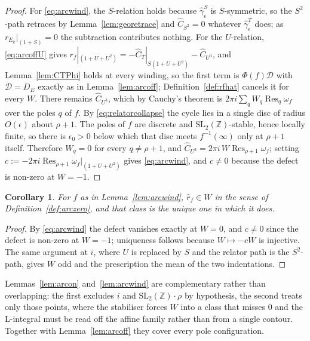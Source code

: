 \documentclass[11pt]{article}
\newtheorem{corollary}[theorem]{Corollary}
\newcommand{\ZZ}{\mathbb{Z}}
\newcommand{\SLZ}{\mathrm{SL}_2(\ZZ)}
\DeclareMathOperator{\Res}{Res}
\begin{document}
\begin{proof}
For \eqref{eq:arcwind}, the $S$-relation holds because $\hat\gamma^S_\epsilon$ is $S$-symmetric,
so the $S^2$-path retraces by Lemma~\ref{lem:georetrace} and $\hat C_{S^2}=0$ whatever
$\hat\gamma^T_\epsilon$ does; as $r_{E_k}|_{(1+S)}=0$ the subtraction contributes nothing. For the
$U$-relation, \eqref{eq:arcoffU} gives
$r_f|_{(1+U+U^2)}=-\hat C_T|_{S(1+U+U^2)}-\hat C_{U^3}$, and Lemma~\ref{lem:CTPhi} holds at every
winding, so the first term is $\Phi(f)\mathcal D$ with $\mathcal D=D_E$ exactly as in
Lemma~\ref{lem:arcoff}; Definition~\ref{def:rfhat} cancels it for every $W$. There remains
$\hat C_{U^3}$, which by Cauchy's theorem is $2\pi i\sum_qW_q\Res_q\omega_f$ over the poles $q$ of
$f$. By \eqref{eq:relatorcollapse} the cycle lies in a single disc of radius $O(\epsilon)$ about
$\rho+1$. The poles of $f$ are discrete and $\SLZ$-stable, hence locally finite, so there is
$\epsilon_0>0$ below which that disc meets $f^{-1}(\infty)$ only at $\rho+1$ itself. Therefore
$W_q=0$ for every $q\ne\rho+1$, and $\hat C_{U^3}=2\pi i\,W\Res_{\rho+1}\omega_f$; setting
$c:=-2\pi i\Res_{\rho+1}\omega_f\big|_{(1+U+U^2)}$ gives \eqref{eq:arcwind}, and $c\ne0$ because
the defect is non-zero at $W=-1$.
\end{proof}

\begin{corollary}\label{cor:arcell}
For $f$ as in Lemma~\ref{lem:arcwind}, $\hat r_f\in W$ in the sense of
Definition~\ref{def:arczero}, and that class is the unique one in which it does.
\end{corollary}

\begin{proof}
By \eqref{eq:arcwind} the defect vanishes exactly at $W=0$, and $c\ne0$ since the defect is
non-zero at $W=-1$; uniqueness follows because $W\mapsto-cW$ is injective. The same argument at
$i$, where $U$ is replaced by $S$ and the relator path is the $S^2$-path, gives $W$ odd and the
prescription the mean of the two indentations.
\end{proof}

Lemmas~\ref{lem:arcon} and~\ref{lem:arcwind} are complementary rather than overlapping: the first
excludes $i$ and $\SLZ\!\cdot\!\rho$ by hypothesis, the second treats only those points, where the
stabiliser forces $W$ into a class that misses $0$ and the L-integral must be read off the affine
family rather than from a single contour. Together with Lemma~\ref{lem:arcoff} they cover every
pole configuration.
\end{document}
